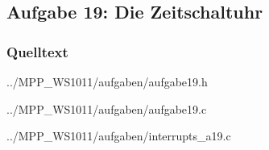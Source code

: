 \subsection*{Aufgabe 19: Die Zeitschaltuhr}

\subsubsection*{Quelltext}

{../MPP_WS1011/aufgaben/aufgabe19.h}


{../MPP_WS1011/aufgaben/aufgabe19.c}


{../MPP_WS1011/aufgaben/interrupts_a19.c}
